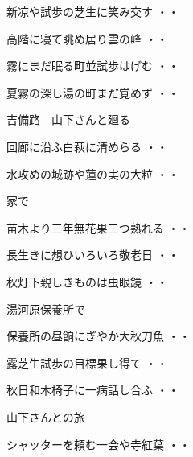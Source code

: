 \begin{shiika}新凉や試歩の芝生に笑み交す
\hfill{・・}\end{shiika}
\begin{shiika}高階に寝て眺め居り雲の峰
\hfill{・・}\end{shiika}
\begin{shiika}霧にまだ眠る町並試歩はげむ
\hfill{・・}\end{shiika}
\begin{shiika}夏霧の深し湯の町まだ覚めず
\hfill{・・}\end{shiika}
\vspace{0.6cm}
吉備路　山下さんと廻る
\begin{shiika}回廊に沿ふ白萩に清めらる
\hfill{・・}\end{shiika}
\begin{shiika}水攻めの城跡や蓮の実の大粒
\hfill{・・}\end{shiika}
\vspace{0.6cm}
家で
\begin{shiika}苗木より三年無花果三つ熟れる
\hfill{・・}\end{shiika}
\begin{shiika}長生きに想ひいろいろ敬老日
\hfill{・・}\end{shiika}
\begin{shiika}秋灯下親しきものは虫眼鏡
\hfill{・・}\end{shiika}
\vspace{0.6cm}
湯河原保養所で
\begin{shiika}保養所の昼餉にぎやか大秋刀魚
\hfill{・・}\end{shiika}
\begin{shiika}露芝生試歩の目標果し得て
\hfill{・・}\end{shiika}
\begin{shiika}秋日和木椅子に一病話し合ふ
\hfill{・・}\end{shiika}
\vspace{0.6cm}
山下さんとの旅
\begin{shiika}シャッターを頼む一会や寺紅葉
\hfill{・・}\end{shiika}
